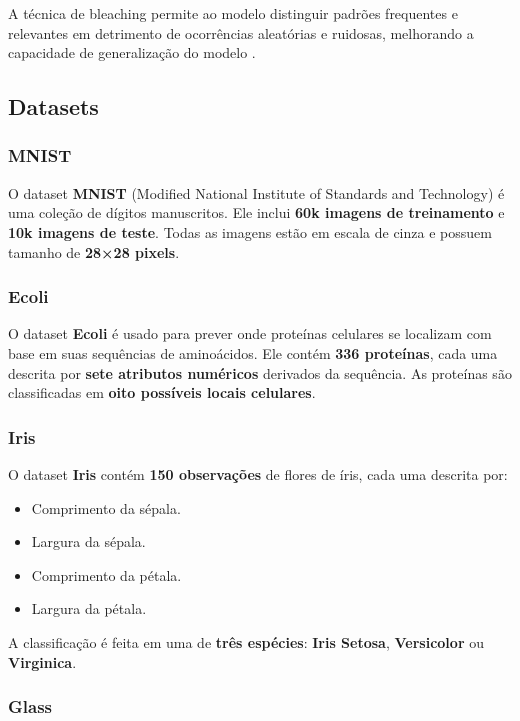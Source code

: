 \documentclass{article}
\begin{document}
A técnica de bleaching permite ao modelo distinguir padrões frequentes e relevantes em detrimento de ocorrências aleatórias e ruidosas, melhorando a capacidade de generalização do modelo \cite{santiago2020}.

\subsection{Datasets}

\subsubsection{MNIST}

O dataset \textbf{MNIST} (Modified National Institute of Standards and Technology) é uma coleção de dígitos manuscritos. Ele inclui \textbf{60k imagens de treinamento} e \textbf{10k imagens de teste}. Todas as imagens estão em escala de cinza e possuem tamanho de \textbf{28×28 pixels}.

\subsubsection{Ecoli}

O dataset \textbf{Ecoli} é usado para prever onde proteínas celulares se localizam com base em suas sequências de aminoácidos. Ele contém \textbf{336 proteínas}, cada uma descrita por \textbf{sete atributos numéricos} derivados da sequência. As proteínas são classificadas em \textbf{oito possíveis locais celulares}.

\subsubsection{Iris}

O dataset \textbf{Iris} contém \textbf{150 observações} de flores de íris, cada uma descrita por:

\begin{itemize}
    \item Comprimento da sépala.
    \item Largura da sépala.
    \item Comprimento da pétala.
    \item Largura da pétala.
\end{itemize}

A classificação é feita em uma de \textbf{três espécies}: \textbf{Iris Setosa}, \textbf{Versicolor} ou \textbf{Virginica}.

\subsubsection{Glass}
\end{document}
